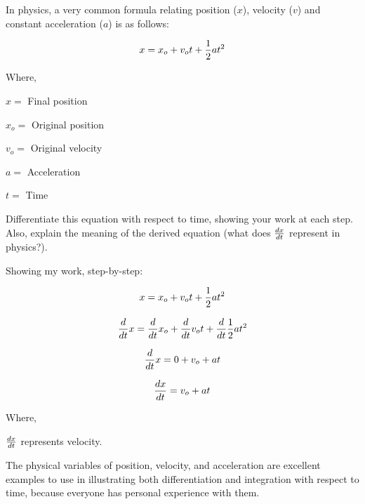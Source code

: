 

In physics, a very common formula relating position ($x$), velocity ($v$) and constant acceleration ($a$) is as follows:

$$x = x_o + v_ot + {1 \over 2}at^2$$

\noindent
Where,

$x =$ Final position

$x_o =$ Original position

$v_o =$ Original velocity

$a =$ Acceleration

$t =$ Time

\vskip 10pt

Differentiate this equation with respect to time, showing your work at each step.  Also, explain the meaning of the derived equation (what does ${dx \over dt}$ represent in physics?).







Showing my work, step-by-step:

$$x = x_o + v_ot + {1 \over 2}at^2$$

$${d \over dt}x = {d \over dt}x_o + {d \over dt}v_ot + {d \over dt}{1 \over 2}at^2$$

$${d \over dt}x = 0 + v_o + at$$

$${dx \over dt} = v_o + at$$

\noindent
Where,

${dx \over dt}$ represents velocity.







The physical variables of position, velocity, and acceleration are excellent examples to use in illustrating both differentiation and integration with respect to time, because everyone has personal experience with them.




